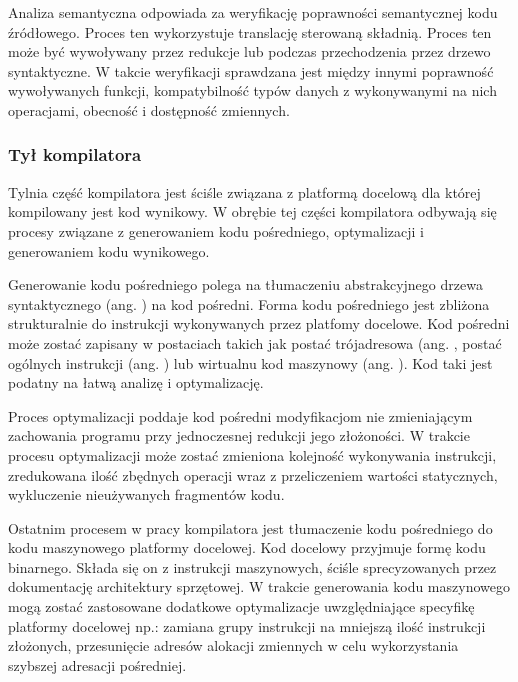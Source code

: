 Analiza semantyczna odpowiada za weryfikację poprawności semantycznej kodu źródłowego. Proces ten wykorzystuje translację sterowaną składnią. Proces ten może być wywoływany przez redukcje lub podczas przechodzenia przez drzewo syntaktyczne. W takcie weryfikacji sprawdzana jest między innymi poprawność wywoływanych funkcji, kompatybilność typów danych z wykonywanymi na nich operacjami, obecność i dostępność zmiennych.

\subsubsection{Tył kompilatora}
Tylnia część kompilatora jest ściśle związana z platformą docelową dla której kompilowany jest kod wynikowy. W obrębie tej części kompilatora odbywają się procesy związane z generowaniem kodu pośredniego, optymalizacji i generowaniem kodu wynikowego.

Generowanie kodu pośredniego polega na tłumaczeniu abstrakcyjnego drzewa syntaktycznego (ang. ) na kod pośredni. Forma kodu pośredniego jest zbliżona strukturalnie do instrukcji wykonywanych przez platfomy docelowe. Kod pośredni może zostać zapisany w postaciach takich jak postać trójadresowa (ang. , postać ogólnych instrukcji (ang. ) lub wirtualnu kod maszynowy (ang. ). Kod taki jest podatny na łatwą analizę i optymalizację.

Proces optymalizacji poddaje kod pośredni modyfikacjom nie zmieniającym zachowania programu przy jednoczesnej redukcji jego złożoności. W trakcie procesu optymalizacji może zostać zmieniona kolejność wykonywania instrukcji, zredukowana ilość zbędnych operacji wraz z przeliczeniem wartości statycznych, wykluczenie nieużywanych fragmentów kodu.

Ostatnim procesem w pracy kompilatora jest tłumaczenie kodu pośredniego do kodu maszynowego platformy docelowej. Kod docelowy przyjmuje formę kodu binarnego. Składa się on z instrukcji maszynowych, ściśle sprecyzowanych przez dokumentację architektury sprzętowej. W trakcie generowania kodu maszynowego mogą zostać zastosowane dodatkowe optymalizacje uwzględniające specyfikę platformy docelowej np.: zamiana grupy instrukcji na mniejszą ilość instrukcji złożonych, przesunięcie adresów alokacji zmiennych w celu wykorzystania szybszej adresacji pośredniej.

%
%
%




